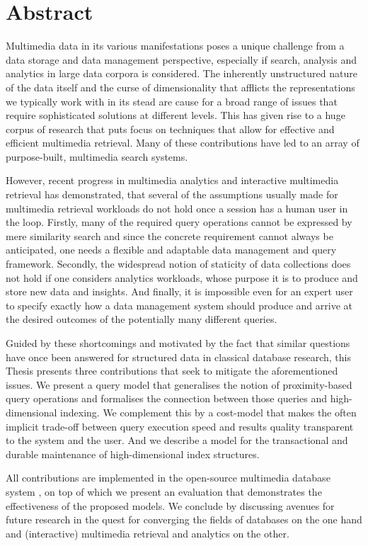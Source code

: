 
\chapter{Abstract}

Multimedia data in its various manifestations poses a unique challenge from a data storage and data management perspective, especially if search, analysis and analytics in large data corpora is considered. The inherently unstructured nature of the data itself and the curse of dimensionality that afflicts the representations we typically work with in its stead are cause for a broad range of issues that require sophisticated solutions at different levels. This has given rise to a huge corpus of research that puts focus on techniques that allow for effective and efficient multimedia retrieval. Many of these contributions have led to an array of purpose-built, multimedia search systems.

However, recent progress in multimedia analytics and interactive multimedia retrieval has demonstrated, that several of the assumptions usually made for multimedia retrieval workloads do not hold once a session has a human user in the loop. Firstly, many of the required query operations cannot be expressed by mere similarity search and since the concrete requirement cannot always be anticipated, one needs a flexible and adaptable data management and query framework. Secondly, the widespread notion of staticity of data collections does not hold if one considers analytics workloads, whose purpose it is to produce and store new data and insights. And finally, it is impossible even for an expert user to specify exactly how a data management system should produce and arrive at the desired outcomes of the potentially many different queries.

Guided by these shortcomings and motivated by the fact that similar questions have once been answered for structured data in classical database research, this Thesis presents three contributions that seek to mitigate the aforementioned issues. We present a query model that generalises the notion of proximity-based query operations and formalises the connection between those queries and high-dimensional indexing. We complement this by a cost-model that makes the often implicit trade-off between query execution speed and results quality transparent to the system and the user. And we describe a model for the transactional and durable maintenance of high-dimensional index structures.

All contributions are implemented in the open-source multimedia database system \cottontail{}, on top of which we present an evaluation that demonstrates the effectiveness of the proposed models. We conclude by discussing avenues for future research in the quest for converging the fields of databases on the one hand and (interactive) multimedia retrieval and analytics on the other.